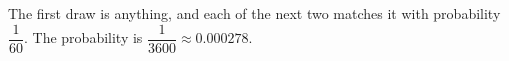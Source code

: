 The first draw is anything, and each of the next two matches it with probability $\dfrac1{60}$. The probability is $\dfrac1{3600}\approx\boxed{0.000278}$.
